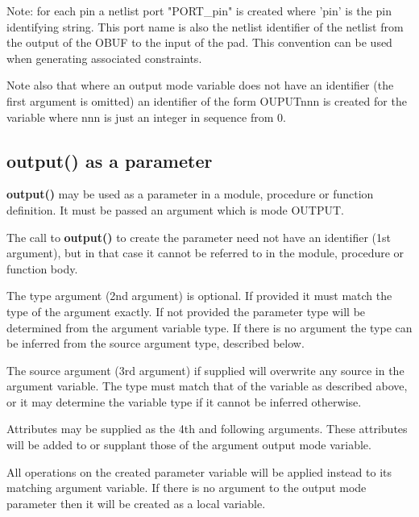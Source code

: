         
        Note: for each pin a netlist port "PORT\_pin" is created where 'pin' is
        the pin identifying string. This port name is also the netlist identifier
        of the netlist from the output of the OBUF to the input of the pad.
        This convention can be used when generating associated constraints.
        
        Note also that where an output mode variable does not have an identifier
        (the first argument is omitted) an identifier of the form OUPUTnnn is
        created for the variable where nnn is just an integer in sequence from 0.

        \subsection{output() as a parameter}
        
            {\bf output()} may be used as a parameter in a module, procedure or
            function definition. It must be passed an argument which is mode OUTPUT.
            
            The call to {\bf output()} to create the parameter need not have an
            identifier (1st argument), but in that case it cannot be referred
            to in the module, procedure or function body.

            The type argument (2nd argument) is optional. If provided it must match
            the type of the argument exactly. If not provided the parameter type
            will be determined from the argument variable type. If there is no
            argument the type can be inferred from the source argument type,
            described below.

            The source argument (3rd argument) if supplied will overwrite any source
            in the argument variable. The type must match that of the variable
            as described above, or it may determine the variable type if it cannot
            be inferred otherwise.

            Attributes may be supplied as the 4th and following arguments. These
            attributes will be added to or supplant those of the argument output mode
            variable.
            
            All operations on the created parameter variable will be applied instead
            to its matching argument variable. If there is no argument to the output
            mode parameter then it will be  created as a local variable.

